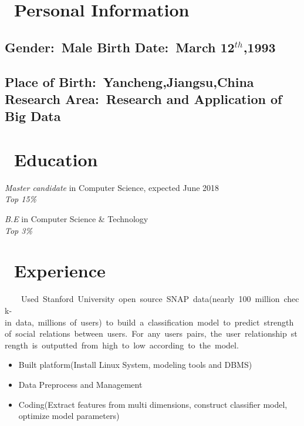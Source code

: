 \documentclass{resume}
\begin{document}



\section{\faLightbulbO\ Personal Information}
  \subsection{\hspace{0.2cm} \textbf{Gender}:\ Male \hspace{4.8cm} \textbf{Birth Date}:\ March 12$^{th}$,1993}
  \subsection{\hspace{0.2cm} \textbf{Place of Birth}:\ Yancheng,Jiangsu,China \hspace{0.45cm} \textbf{Research Area}:\ Research and Application of Big Data}
\medskip


\section{\faGraduationCap\ Education}
\textit{Master candidate} in Computer Science, expected June 2018\\
\textit{Top 15\%}

\textit{B.E} in Computer Science \& Technology \\
\textit{Top 3\%}
\medskip


\section{\faUsers\ Experience}
{\ \ \ \ Used\ Stanford\ University\ open\ source\ SNAP\ data(nearly\ 100\ million\ check-in\ data,\ millions\ of\ users)\ to\ build\ a\ classification\ model\ to\ predict\ strength\ of\ social\ relations\ between\ users.\ For\ any\ users\ pairs,\ the\ user\ relationship\ strength\ is\ outputted\ from\ high\ to\ low\ according\ to\ the\ model. }
\begin{itemize}
  \item Built platform(Install Linux System, modeling tools and DBMS)
  \item Data Preprocess and Management
  \item Coding(Extract features from multi dimensions, construct classifier model, optimize model parameters)
\end{itemize}
\medskip
\end{document}
